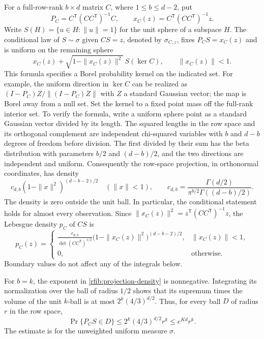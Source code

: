 For a full-row-rank \(b\times d\) matrix \(C\), where \(1\le b\le d-2\),
put
\[
 P_C=C^{\mathsf T}(CC^{\mathsf T})^{-1}C,\qquad
 x_C(z)=C^{\mathsf T}(CC^{\mathsf T})^{-1}z .
\]
Write \(S(H)=\{u\in H:\|u\|=1\}\) for the unit sphere of a subspace
\(H\).  The conditional law of \(S\sim\sigma\) given \(CS=z\), denoted by
\(\sigma_{C,z}\), fixes \(P_CS=x_C(z)\) and is uniform on the remaining
sphere
\[
 x_C(z)+\sqrt{1-\|x_C(z)\|^2}\,
       S(\ker C),\qquad \|x_C(z)\|<1.
\]
This formula specifies a Borel probability kernel on the indicated
set.  For example, the uniform direction in \(\ker C\) can be realized
as \((I-P_C)Z/\|(I-P_C)Z\|\) with \(Z\) a standard Gaussian vector;
the map is Borel away from a null set.  Set the kernel to a fixed point mass off
the full-rank interior set.  To verify the formula, write a uniform
sphere point as a standard Gaussian vector divided by its length.
The squared lengths in the row space and its orthogonal complement are
independent chi-squared variables with \(b\) and \(d-b\) degrees of
freedom before division.  The first divided by their sum has the beta distribution with
parameters \(b/2\) and \((d-b)/2\), and the two directions are
independent and uniform.  Consequently the row-space projection, in
orthonormal coordinates, has density
\begin{equation}\label{rfib:projection-density}
 c_{d,b}(1-\|x\|^2)^{(d-b-2)/2}\quad(\|x\|<1),
 \qquad
 c_{d,b}=\frac{\Gamma(d/2)}
               {\pi^{b/2}\Gamma((d-b)/2)} .
\end{equation}
The density is zero outside the unit ball.  In particular, the conditional statement holds for almost every
observation.  Since
\(\|x_C(z)\|^2=z^{\mathsf T}(CC^{\mathsf T})^{-1}z\), the
Lebesgue density \(p_C\) of \(CS\) is
\begin{equation}\label{rfib:label-density}
 p_C(z)=
 \begin{cases}
 \displaystyle
 \frac{c_{d,b}}{\det(CC^{\mathsf T})^{1/2}}
 \bigl(1-\|x_C(z)\|^2\bigr)^{(d-b-2)/2},
       &\|x_C(z)\|<1,\\
 0,    &\text{otherwise}.
 \end{cases}
\end{equation}
Boundary values do not affect any of the integrals below.

For \(b=k\), the exponent in \eqref{rfib:projection-density} is
nonnegative.  Integrating its normalization over the ball of radius
\(1/2\) shows that its supremum times the volume of the unit \(k\)-ball
is at most \(2^k(4/3)^{d/2}\).  Thus, for every ball \(D\) of radius
\(r\) in the row space,
\begin{equation}\label{rfib:projection-ball}
 \Pr\{P_CS\in D\}\le 2^k(4/3)^{d/2}r^k\le e^{Kd}r^k.
\end{equation}
The estimate is for the unweighted uniform measure \(\sigma\).

